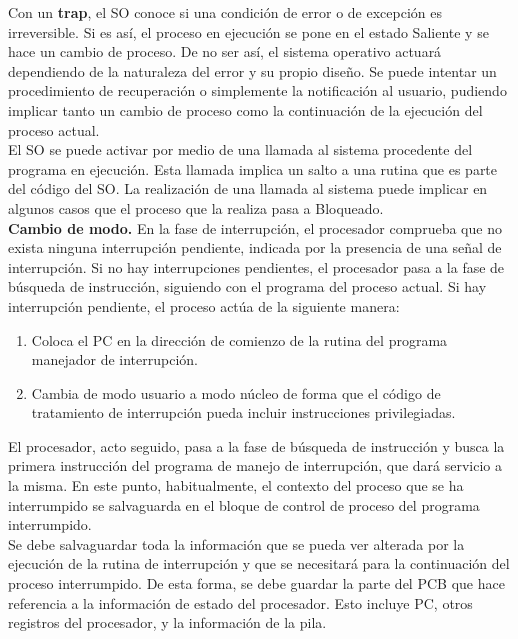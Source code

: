 \documentclass{article}
\begin{document}
				Con un \textbf{trap}, el SO conoce si una condición de error o de excepción es irreversible. Si es así, el proceso en ejecución se pone en el estado Saliente y se hace un cambio de proceso. De no ser así, el sistema operativo actuará dependiendo de la naturaleza del error y su propio diseño. Se puede intentar un procedimiento de recuperación o simplemente la notificación al usuario, pudiendo implicar tanto un cambio de proceso como la continuación de la ejecución del proceso actual. \\
				
				El SO se puede activar por medio de una llamada al sistema procedente del programa en ejecución. Esta llamada implica un salto a una rutina que es parte del código del SO. La realización de una llamada al sistema puede implicar en algunos casos que el proceso que la realiza pasa a Bloqueado. \\
				
				\textbf{Cambio de modo.} En la fase de interrupción, el procesador comprueba que no exista ninguna interrupción pendiente, indicada por la presencia de una señal de interrupción. Si no hay interrupciones pendientes, el procesador pasa a la fase de búsqueda de instrucción, siguiendo con el programa del proceso actual. Si hay interrupción pendiente, el proceso actúa de la siguiente manera:
				
				\begin{enumerate}
				\item Coloca el PC en la dirección de comienzo de la rutina del programa manejador de interrupción.
				\item Cambia de modo usuario a modo núcleo de forma que el código de tratamiento de interrupción pueda incluir instrucciones privilegiadas.
				\end{enumerate}

				El procesador, acto seguido, pasa a la fase de búsqueda de instrucción y busca la primera instrucción del programa de manejo de interrupción, que dará servicio a la misma. En este punto, habitualmente, el contexto del proceso que se ha interrumpido se salvaguarda en el bloque de control de proceso del programa interrumpido. \\
				
				Se debe salvaguardar toda la información que se pueda ver alterada por la ejecución de la rutina de interrupción y que se necesitará para la continuación del proceso interrumpido. De esta forma, se debe guardar la parte del PCB que hace referencia a la información de estado del procesador. Esto incluye PC, otros registros del procesador, y la información de la pila.	\\
				
\end{document}
